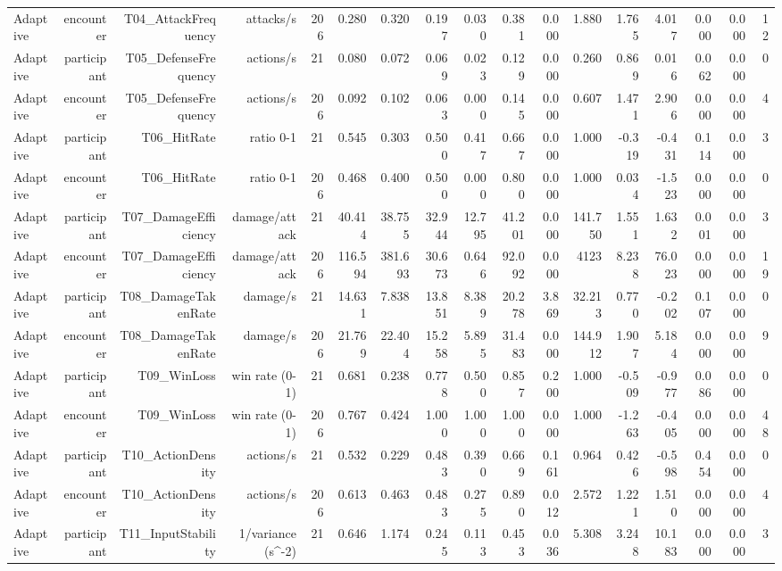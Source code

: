 \documentclass[10pt]{article}
\begin{document}
{\begin{longtable}{lrrrrrrrrrrrrrrrr}
Adaptive & encounter & T04\_AttackFrequency & attacks/s & 206 & 0.280 & 0.320 & 0.197 & 0.030 & 0.381 & 0.000 & 1.880 & 1.765 & 4.017 & 0.000 & 0.000 & 12 \\
Adaptive & participant & T05\_DefenseFrequency & actions/s & 21 & 0.080 & 0.072 & 0.069 & 0.023 & 0.129 & 0.000 & 0.260 & 0.869 & 0.016 & 0.062 & 0.000 & 0 \\
Adaptive & encounter & T05\_DefenseFrequency & actions/s & 206 & 0.092 & 0.102 & 0.063 & 0.000 & 0.145 & 0.000 & 0.607 & 1.471 & 2.906 & 0.000 & 0.000 & 4 \\
Adaptive & participant & T06\_HitRate & ratio 0-1 & 21 & 0.545 & 0.303 & 0.500 & 0.417 & 0.667 & 0.000 & 1.000 & -0.319 & -0.431 & 0.114 & 0.000 & 3 \\
Adaptive & encounter & T06\_HitRate & ratio 0-1 & 206 & 0.468 & 0.400 & 0.500 & 0.000 & 0.800 & 0.000 & 1.000 & 0.034 & -1.523 & 0.000 & 0.000 & 0 \\
Adaptive & participant & T07\_DamageEfficiency & damage/attack & 21 & 40.414 & 38.755 & 32.944 & 12.795 & 41.201 & 0.000 & 141.750 & 1.551 & 1.632 & 0.001 & 0.000 & 3 \\
Adaptive & encounter & T07\_DamageEfficiency & damage/attack & 206 & 116.594 & 381.693 & 30.673 & 0.646 & 92.092 & 0.000 & 4123 & 8.238 & 76.023 & 0.000 & 0.000 & 19 \\
Adaptive & participant & T08\_DamageTakenRate & damage/s & 21 & 14.631 & 7.838 & 13.851 & 8.389 & 20.278 & 3.869 & 32.213 & 0.770 & -0.202 & 0.107 & 0.000 & 0 \\
Adaptive & encounter & T08\_DamageTakenRate & damage/s & 206 & 21.769 & 22.404 & 15.258 & 5.895 & 31.483 & 0.000 & 144.912 & 1.907 & 5.184 & 0.000 & 0.000 & 9 \\
Adaptive & participant & T09\_WinLoss & win rate (0-1) & 21 & 0.681 & 0.238 & 0.778 & 0.500 & 0.857 & 0.200 & 1.000 & -0.509 & -0.977 & 0.086 & 0.000 & 0 \\
Adaptive & encounter & T09\_WinLoss & win rate (0-1) & 206 & 0.767 & 0.424 & 1.000 & 1.000 & 1.000 & 0.000 & 1.000 & -1.263 & -0.405 & 0.000 & 0.000 & 48 \\
Adaptive & participant & T10\_ActionDensity & actions/s & 21 & 0.532 & 0.229 & 0.483 & 0.390 & 0.669 & 0.161 & 0.964 & 0.426 & -0.598 & 0.454 & 0.000 & 0 \\
Adaptive & encounter & T10\_ActionDensity & actions/s & 206 & 0.613 & 0.463 & 0.483 & 0.275 & 0.890 & 0.012 & 2.572 & 1.221 & 1.510 & 0.000 & 0.000 & 4 \\
Adaptive & participant & T11\_InputStability & 1/variance (s\textasciicircum{}-2) & 21 & 0.646 & 1.174 & 0.245 & 0.113 & 0.453 & 0.036 & 5.308 & 3.248 & 10.183 & 0.000 & 0.000 & 3 \\

\end{longtable}}
\end{document}

